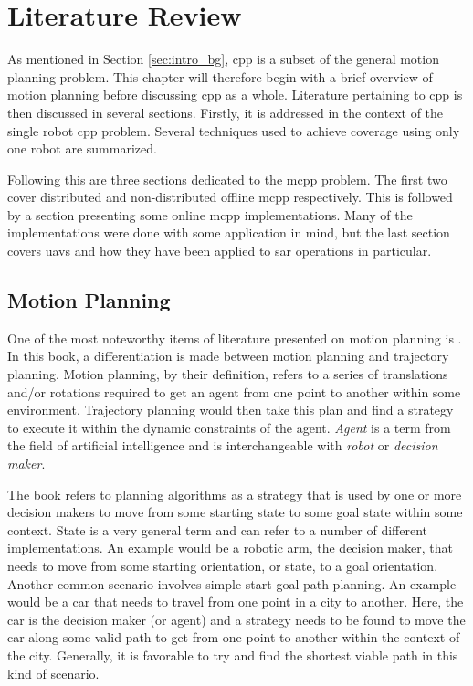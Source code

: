 \chapter{Literature Review}
\label{chp:LR}
As mentioned in Section \ref{sec:intro_bg}, \acl{cpp} is a subset of the general motion planning problem. This chapter will therefore begin with a brief overview of motion planning before discussing \acs{cpp} as a whole. Literature pertaining to \acs{cpp} is then discussed in several sections. Firstly, it is addressed in the context of the single robot \acs{cpp} problem. Several techniques used to achieve coverage using only one robot are summarized. 

Following this are three sections dedicated to the \acf{mcpp} problem. The first two cover distributed and non-distributed offline \acs{mcpp} respectively. This is followed by a section presenting some online \acs{mcpp} implementations. Many of the implementations were done with some application in mind, but the last section covers \acsp{uav} and how they have been applied to \acs{sar} operations in particular.

\section{Motion Planning}
\label{sec:LR-Motion Planning}
One of the most noteworthy items of literature presented on motion planning is \cite{Lavalle2006}. In this book, a differentiation is made between motion planning and trajectory planning. Motion planning, by their definition, refers to a series of translations and/or rotations required to get an agent from one point to another within some environment. Trajectory planning would then take this plan and find a strategy to execute it within the dynamic constraints of the agent. \emph{Agent} is a term from the field of artificial intelligence and is interchangeable with \emph{robot} or \emph{decision maker}.

The book refers to planning algorithms as a strategy that is used by one or more decision makers to move from some starting state to some goal state within some context. State is a very general term and can refer to a number of different implementations. An example would be a robotic arm, the decision maker, that needs to move from some starting orientation, or state, to a goal orientation. Another common scenario involves simple start-goal path planning. An example would be a car that needs to travel from one point in a city to another. Here, the car is the decision maker (or agent) and a strategy needs to be found to move the car along some valid path to get from one point to another within the context of the city. Generally, it is favorable to try and find the shortest viable path in this kind of scenario.

